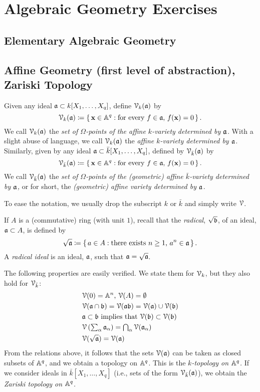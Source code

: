 \chapter{Algebraic Geometry Exercises}
\section{Elementary Algebraic Geometry}
\section{Affine Geometry (first level of abstraction), Zariski Topology}
\begin{definition}
Given any ideal $\mathfrak{a}\subset k[X_1,\dotsc,X_q]$, define $\mathcal{V}_k(\mathfrak{a})$
by
\[
\mathcal{V}_k(\mathfrak{a})\coloneqq\left\{\,\mathbf{x}\in\mathbb{A}^q:\text{for every
$f\in\mathfrak{a}$, $f(\mathbf{x})=0$}\,\right\}.
\]
We call $\mathcal{V}_k(\mathfrak{a})$ the \emph{set of $\Omega$-points of the affine
  $k$-variety determined by $\mathfrak{a}$.} With a slight abuse of language, we
call $\mathcal{V}_k(\mathfrak{a})$ the \emph{affine $k$-variety determined by $\mathfrak{a}$.}
Similarly, given by any ideal $\mathfrak{a}\subset\bar k[X_1,\dotsc,X_q]$,
defined by $\mathcal{V}_{\bar k}(\mathfrak{a})$ by
\[
\mathcal{V}_{\bar k}(\mathfrak{a})\coloneqq\left\{\,\mathbf{x}\in \mathbb{A}^q:
\text{for every $f\in\mathfrak{a}$, $f(\mathbf{x})=0$}\,\right\}.
\]
We call $\mathcal{V}_{\bar k}(\mathfrak{a})$ the \emph{set of $\Omega$-points of the
  (geometric) affine $\bar k$-variety determined by $\mathfrak{a}$,} or for
short, the \emph{(geometric) affine variety determined by $\mathfrak{a}$.}
\end{definition}

To ease the notation, we usually drop the subscript $k$ or $\bar k$ and
simply write $\mathcal{V}$.

If $A$ is a (commutative) ring (with unit $1$), recall that the
\emph{radical}, $\sqrt{\mathfrak{b}}$, of an ideal, $\mathfrak{a}\subset A$, is defined
by
\[
\sqrt{\mathfrak{a}}\coloneqq\left\{\,a\in A:\text{there exists $n\geq 1$,
    $a^n\in\mathfrak{a}$}\,\right\}.
\]
A \emph{radical ideal} is an ideal, $\mathfrak{a}$, such that
$\mathfrak{a}=\sqrt{\mathfrak{a}}$.

The following properties are easily verified. We state them for $\mathcal{V}_k$, but
they also hold for $\mathcal{V}_{\bar k}$:
\begin{align*}
&\text{$\mathcal{V}(0)=\mathbb{A}^n$, $\mathcal{V}(A)=\emptyset$}\\
&\mathcal{V}(\mathfrak{a}\cap\mathfrak{b})=\mathcal{V}(\mathfrak{a}\mathfrak{b})=\mathcal{V}(\mathfrak{a})\cup\mathcal{V}(\mathfrak{b})\\
&\text{$\mathfrak{a}\subset\mathfrak{b}$ implies that $\mathcal{V}(\mathfrak{b})\subset\mathcal{V}(\mathfrak{b})$}\\
&\mathcal{V}\left({\textstyle\sum_\alpha\mathfrak{a}_\alpha}\right)
={\textstyle \bigcap_\alpha\mathcal{V}(\mathfrak{a}_\alpha)}\\
&\mathcal{V}(\sqrt{\mathfrak{a}})=\mathcal{V}(\mathfrak{a})
\end{align*}
From the relations above, it follows that the sets $\mathcal{V}(\mathfrak{a})$ can be taken
as closed subsets of $\mathbb{A}^q$, and we obtain a topology on $\mathbb{A}^q$. This
is the \emph{$k$-topology on $\mathbb{A}^q$.} If we consider ideals in $\bar
k[X_1,\dotsc,X_q]$ (i.e., sets of the form $\mathcal{V}_{\bar k}(\mathfrak{a})$), we obtain
the \emph{Zariski topology on $\mathbb{A}^q$.}

